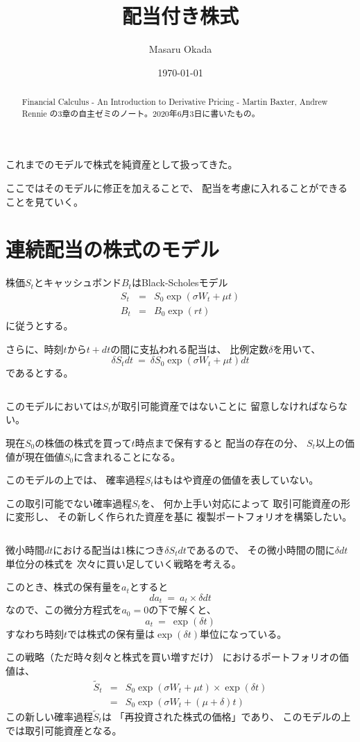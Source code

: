 \documentclass[uplatex,a4j,12pt,dvipdfmx]{jsarticle}
\title{配当付き株式}
\author{Masaru Okada
}
\date{ \today }
\begin{document}
\maketitle

\begin{abstract}
	Financial Calculus - An Introduction to Derivative Pricing - Martin Baxter, Andrew Rennie の3章の自主ゼミのノート。2020年6月3日に書いたもの。
\end{abstract}
これまでのモデルで株式を純資産として扱ってきた。

ここではそのモデルに修正を加えることで、
配当を考慮に入れることができることを見ていく。
\section{連続配当の株式のモデル}
株価$S_{t}$とキャッシュボンド$B_{t}$はBlack-Scholesモデル
%
\begin{eqnarray*}
	S_{t}
	&=&
	S_{0} \exp (\sigma W_{t} + \mu t )
	\\
	B_{t}
	&=&
	B_{0} \exp (rt)
\end{eqnarray*}
%
に従うとする。

さらに、時刻$t$から$t+dt$の間に支払われる配当は、
比例定数$\delta$を用いて、
$$
	\delta S_{t} dt
	\ = \
	\delta S_{0} \exp (\sigma W_{t} + \mu t ) dt
$$
であるとする。

${}$

このモデルにおいては$S_{t}$が取引可能資産ではないことに
留意しなければならない。

現在$S_{0}$の株価の株式を買って$t$時点まで保有すると
配当の存在の分、
$S_{t}$以上の価値が現在価値$S_{0}$に含まれることになる。

このモデルの上では、
確率過程$S_{t}$はもはや資産の価値を表していない。
${}$

この取引可能でない確率過程$S_{t}$を、
何か上手い対応によって
取引可能資産の形に変形し、
その新しく作られた資産を基に
複製ポートフォリオを構築したい。

${}$

微小時間$dt$における配当は1株につき$\delta S_{t} dt$であるので、
その微小時間の間に$\delta dt$単位分の株式を
次々に買い足していく戦略を考える。

このとき、株式の保有量を$a_{t}$とすると
$$
	d a_{t} \ = \ a_{t} \times \delta dt
$$
なので、この微分方程式を$a_{0}=0$の下で解くと、
$$
	a_{t} \ = \ \exp ( \delta t )
$$
すなわち時刻$t$では株式の保有量は$\exp ( \delta t )$単位になっている。

この戦略（ただ時々刻々と株式を買い増すだけ）
におけるポートフォリオの価値は、
%
\begin{eqnarray*}
	\tilde{S}_{t}
	&=&
	S_{0} \exp (\sigma W_{t} + \mu t ) \times \exp ( \delta t )
	\\ &=&
	S_{0} \exp (\sigma W_{t} + ( \mu + \delta ) t )
\end{eqnarray*}
%
この新しい確率過程$\tilde{S}_{t}$は
「再投資された株式の価格」であり、
このモデルの上では取引可能資産となる。
\end{document}
